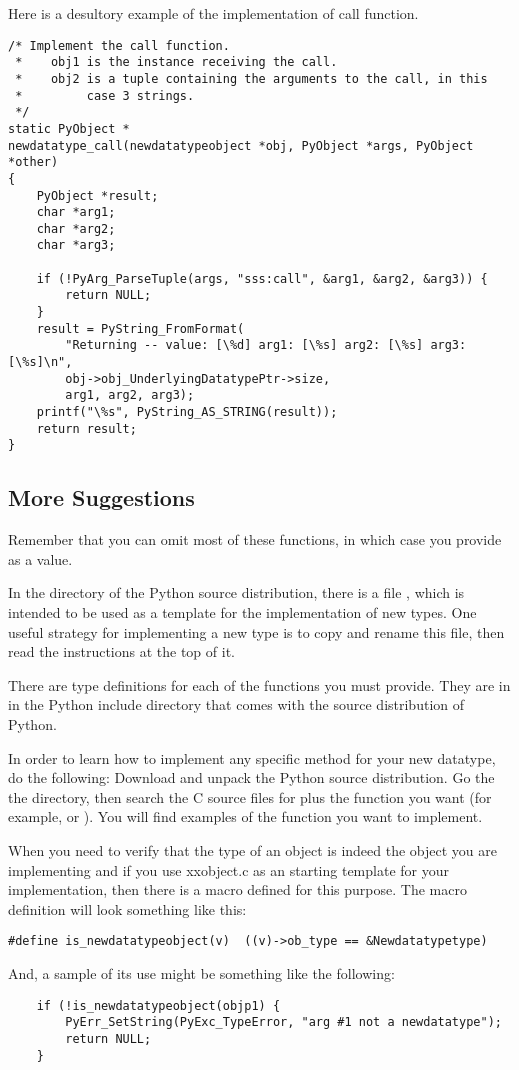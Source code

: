 Here is a desultory example of the implementation of call function.

\begin{verbatim}
/* Implement the call function.
 *    obj1 is the instance receiving the call.
 *    obj2 is a tuple containing the arguments to the call, in this
 *         case 3 strings.
 */
static PyObject *
newdatatype_call(newdatatypeobject *obj, PyObject *args, PyObject *other)
{
    PyObject *result;
    char *arg1;
    char *arg2;
    char *arg3;

    if (!PyArg_ParseTuple(args, "sss:call", &arg1, &arg2, &arg3)) {
        return NULL;
    }
    result = PyString_FromFormat(
        "Returning -- value: [\%d] arg1: [\%s] arg2: [\%s] arg3: [\%s]\n",
        obj->obj_UnderlyingDatatypePtr->size,
        arg1, arg2, arg3);
    printf("\%s", PyString_AS_STRING(result));
    return result;
}
\end{verbatim}


\subsection{More Suggestions}

Remember that you can omit most of these functions, in which case you
provide  as a value.

In the  directory of the Python source distribution,
there is a file , which is intended to be used as a
template for the implementation of new types.  One useful strategy
for implementing a new type is to copy and rename this file, then
read the instructions at the top of it.

There are type definitions for each of the functions you must
provide.  They are in  in the Python include
directory that comes with the source distribution of Python.

In order to learn how to implement any specific method for your new
datatype, do the following: Download and unpack the Python source
distribution.  Go the the  directory, then search the
C source files for  plus the function you want (for
example,  or ).  You will find
examples of the function you want to implement.

When you need to verify that the type of an object is indeed the
object you are implementing and if you use xxobject.c as an starting
template for your implementation, then there is a macro defined for
this purpose. The macro definition will look something like this:

\begin{verbatim}
#define is_newdatatypeobject(v)  ((v)->ob_type == &Newdatatypetype)
\end{verbatim}

And, a sample of its use might be something like the following:

\begin{verbatim}
    if (!is_newdatatypeobject(objp1) {
        PyErr_SetString(PyExc_TypeError, "arg #1 not a newdatatype");
        return NULL;
    }
\end{verbatim}
